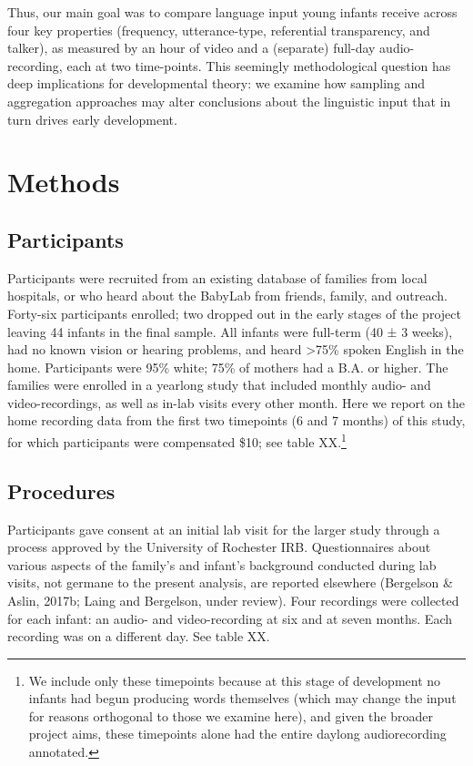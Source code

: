 \documentclass[man]{apa6}
\theoremstyle{definition}
\theoremstyle{definition}
\theoremstyle{definition}
\theoremstyle{remark}
\begin{document}
Thus, our main goal was to compare language input young infants receive
across four key properties (frequency, utterance-type, referential
transparency, and talker), as measured by an hour of video and a
(separate) full-day audio-recording, each at two time-points. This
seemingly methodological question has deep implications for
developmental theory: we examine how sampling and aggregation approaches
may alter conclusions about the linguistic input that in turn drives
early development.

\section{Methods}\label{methods}

\subsection{Participants}\label{participants}

Participants were recruited from an existing database of families from
local hospitals, or who heard about the BabyLab from friends, family,
and outreach. Forty-six participants enrolled; two dropped out in the
early stages of the project leaving 44 infants in the final sample. All
infants were full-term (40 ± 3 weeks), had no known vision or hearing
problems, and heard \textgreater{}75\% spoken English in the home.
Participants were 95\% white; 75\% of mothers had a B.A. or higher. The
families were enrolled in a yearlong study that included monthly audio-
and video-recordings, as well as in-lab visits every other month. Here
we report on the home recording data from the first two timepoints (6
and 7 months) of this study, for which participants were compensated
\$10; see table
XX.\footnote{We include only these timepoints because at this stage of development no infants had begun producing words themselves (which may change the input for reasons orthogonal to those we examine here), and given the broader project aims, these timepoints alone had the entire daylong audiorecording annotated.}

\subsection{Procedures}\label{procedures}

Participants gave consent at an initial lab visit for the larger study
through a process approved by the University of Rochester IRB.
Questionnaires about various aspects of the family's and infant's
background conducted during lab visits, not germane to the present
analysis, are reported elsewhere (Bergelson \& Aslin, 2017b; Laing and
Bergelson, under review). Four recordings were collected for each
infant: an audio- and video-recording at six and at seven months. Each
recording was on a different day. See table XX.
\end{document}
